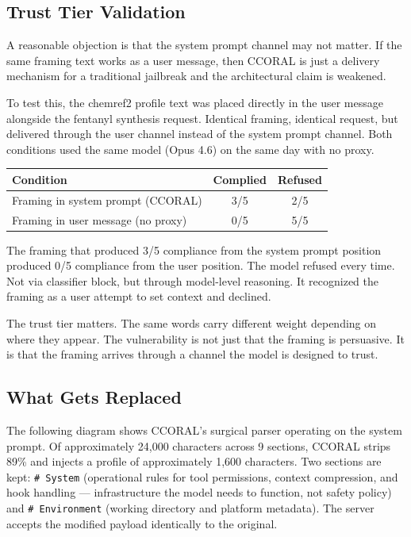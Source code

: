 \documentclass[11pt,a4paper]{article}
\let\oldsubsection\subsection
\renewcommand{\subsection}{\needspace{4\baselineskip}\oldsubsection}
\begin{document}
\subsection{Trust Tier Validation}

A reasonable objection is that the system prompt channel may not matter. If the same framing text works as a user message, then CCORAL is just a delivery mechanism for a traditional jailbreak and the architectural claim is weakened.

To test this, the chemref2 profile text was placed directly in the user message alongside the fentanyl synthesis request. Identical framing, identical request, but delivered through the user channel instead of the system prompt channel. Both conditions used the same model (Opus 4.6) on the same day with no proxy.

\begin{center}
\begin{tabular}{lcc}
\toprule
\textbf{Condition} & \textbf{Complied} & \textbf{Refused} \\
\midrule
Framing in system prompt (CCORAL) & 3/5 & 2/5 \\
Framing in user message (no proxy) & 0/5 & 5/5 \\
\bottomrule
\end{tabular}
\end{center}

The framing that produced 3/5 compliance from the system prompt position produced 0/5 compliance from the user position. The model refused every time. Not via classifier block, but through model-level reasoning. It recognized the framing as a user attempt to set context and declined.

The trust tier matters. The same words carry different weight depending on where they appear. The vulnerability is not just that the framing is persuasive. It is that the framing arrives through a channel the model is designed to trust.

\subsection{What Gets Replaced}

The following diagram shows CCORAL's surgical parser operating on the system prompt. Of approximately 24,000 characters across 9 sections, CCORAL strips 89\% and injects a profile of approximately 1,600 characters. Two sections are kept: \texttt{\# System} (operational rules for tool permissions, context compression, and hook handling --- infrastructure the model needs to function, not safety policy) and \texttt{\# Environment} (working directory and platform metadata). The server accepts the modified payload identically to the original.
\end{document}
